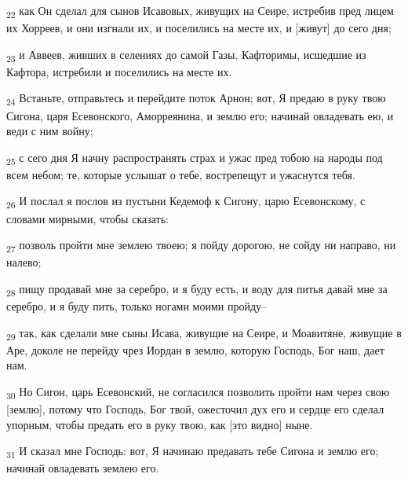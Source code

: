 \begin{tcolorbox}
\textsubscript{22} как Он сделал для сынов Исавовых, живущих на Сеире, истребив пред лицем их Хорреев, и они изгнали их, и поселились на месте их, и [живут] до сего дня;
\end{tcolorbox}
\begin{tcolorbox}
\textsubscript{23} и Аввеев, живших в селениях до самой Газы, Кафторимы, исшедшие из Кафтора, истребили и поселились на месте их.
\end{tcolorbox}
\begin{tcolorbox}
\textsubscript{24} Встаньте, отправьтесь и перейдите поток Арнон; вот, Я предаю в руку твою Сигона, царя Есевонского, Аморреянина, и землю его; начинай овладевать ею, и веди с ним войну;
\end{tcolorbox}
\begin{tcolorbox}
\textsubscript{25} с сего дня Я начну распространять страх и ужас пред тобою на народы под всем небом; те, которые услышат о тебе, вострепещут и ужаснутся тебя.
\end{tcolorbox}
\begin{tcolorbox}
\textsubscript{26} И послал я послов из пустыни Кедемоф к Сигону, царю Есевонскому, с словами мирными, чтобы сказать:
\end{tcolorbox}
\begin{tcolorbox}
\textsubscript{27} позволь пройти мне землею твоею; я пойду дорогою, не сойду ни направо, ни налево;
\end{tcolorbox}
\begin{tcolorbox}
\textsubscript{28} пищу продавай мне за серебро, и я буду есть, и воду для питья давай мне за серебро, и я буду пить, только ногами моими пройду--
\end{tcolorbox}
\begin{tcolorbox}
\textsubscript{29} так, как сделали мне сыны Исава, живущие на Сеире, и Моавитяне, живущие в Аре, доколе не перейду чрез Иордан в землю, которую Господь, Бог наш, дает нам.
\end{tcolorbox}
\begin{tcolorbox}
\textsubscript{30} Но Сигон, царь Есевонский, не согласился позволить пройти нам через свою [землю], потому что Господь, Бог твой, ожесточил дух его и сердце его сделал упорным, чтобы предать его в руку твою, как [это видно] ныне.
\end{tcolorbox}
\begin{tcolorbox}
\textsubscript{31} И сказал мне Господь: вот, Я начинаю предавать тебе Сигона и землю его; начинай овладевать землею его.
\end{tcolorbox}
